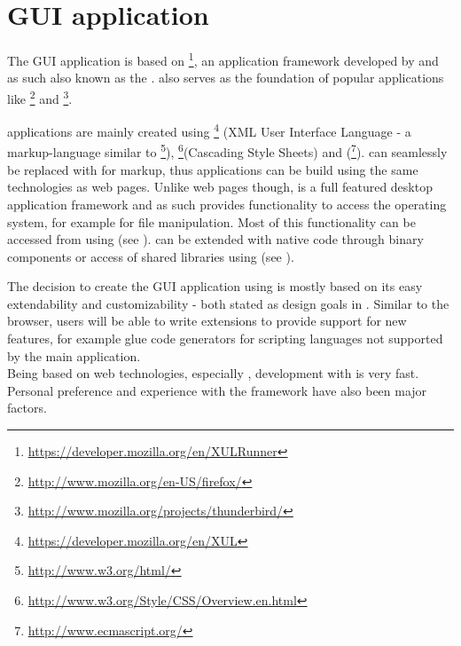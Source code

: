 \chapter{GUI application}
\label{chap:GUIApplication}

The GUI application is based on \footnote{\url{https://developer.mozilla.org/en/XULRunner}}, an application framework developed by  and as such also known as the .  also serves as the foundation of popular applications like \footnote{\url{http://www.mozilla.org/en-US/firefox/}} and \footnote{\url{http://www.mozilla.org/projects/thunderbird/}}. 

 applications are mainly created using \footnote{\url{https://developer.mozilla.org/en/XUL}} (XML User Interface Language - a markup-language similar to \footnote{\url{http://www.w3.org/html/}}), \footnote{\url{http://www.w3.org/Style/CSS/Overview.en.html}}(Cascading Style Sheets) and  (\footnote{\url{http://www.ecmascript.org/}}).  can seamlessly be replaced with  for markup, thus  applications can be build using the same technologies as web pages. Unlike web pages though,  is a full featured desktop application framework and as such provides functionality to access the operating system, for example for file manipulation. Most of this functionality can be accessed from  using  (see ).  can be extended with native code through  binary components or access of shared libraries using  (see ).

The decision to create the GUI application using  is mostly based on its easy extendability and customizability - both stated as design goals in . Similar to the  browser, users will be able to write extensions to provide support for new features, for example glue code generators for scripting languages not supported by the main application.\\
Being based on web technologies, especially , development with   is very fast.
\\Personal preference and experience with the framework have also been major factors.

